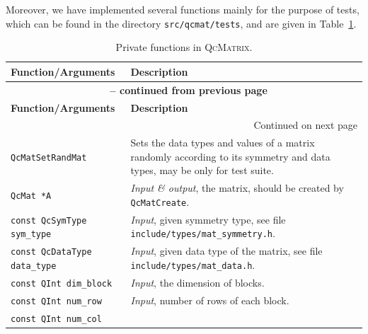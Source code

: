 \documentclass[a4paper,11pt,twoside,openright]{book}
\begin{document}
Moreover, we have implemented several functions mainly for the purpose of
tests, which can be found in the directory \verb|src/qcmat/tests|, and are
given in Table~\ref{tab-QcMat-private-fun}.
\begin{center}
  \small
  \begin{longtable}{l|p{}}
    \caption{Private functions in \textsc{QcMatrix}.}
    \label{tab-QcMat-private-fun}\\
    \hline\hline
    \textbf{Function/Arguments} & \textbf{Description}\\
    \hline
    \endfirsthead
    \multicolumn{2}{c}{{\bfseries \tablename\ \thetable{} -- continued from previous page}}\\
    \hline\hline
    \textbf{Function/Arguments} & \textbf{Description}\\
    \hline
    \endhead
    \hline
    \multicolumn{2}{r}{Continued on next page}\\
    \hline
    \endfoot
    \hline\hline
    \endlastfoot
%
    \verb|QcMatSetRandMat|\index{\texttt{QcMatSetRandMat}} %
      & Sets the data types and values of a matrix randomly according to its
        symmetry and data types, may be only for test suite.\\
    \hspace*{2ex}\verb|QcMat *A| %
      & \textsl{Input \& output}, the matrix, should be created by \verb|QcMatCreate|.\\
    \hspace*{2ex}\verb|const QcSymType sym_type| %
      & \textsl{Input}, given symmetry type, see file
        \verb|include/types/mat_symmetry.h|.\\
    \hspace*{2ex}\verb|const QcDataType data_type| %
      & \textsl{Input}, given data type of the matrix,
        see file \verb|include/types/mat_data.h|.\\
    \hspace*{2ex}\verb|const QInt dim_block| %
      & \textsl{Input}, the dimension of blocks.\\
    \hspace*{2ex}\verb|const QInt num_row| %
      & \textsl{Input}, number of rows of each block.\\
    \hspace*{2ex}\verb|const QInt num_col| %

\end{longtable}
\end{center}
\end{document}
